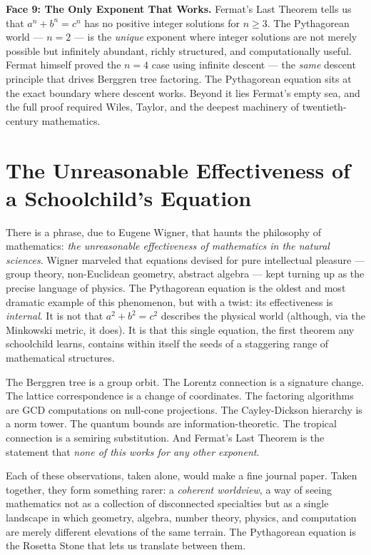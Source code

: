 \documentclass[11pt,twoside,openright]{book}
\theoremstyle{definition}
\theoremstyle{remark}
\begin{document}
\textbf{Face 9: The Only Exponent That Works.} Fermat's Last Theorem tells us that $a^n + b^n = c^n$ has no positive integer solutions for $n \geq 3$. The Pythagorean world --- $n = 2$ --- is the \textit{unique} exponent where integer solutions are not merely possible but infinitely abundant, richly structured, and computationally useful. Fermat himself proved the $n = 4$ case using infinite descent --- the \textit{same} descent principle that drives Berggren tree factoring. The Pythagorean equation sits at the exact boundary where descent works. Beyond it lies Fermat's empty sea, and the full proof required Wiles, Taylor, and the deepest machinery of twentieth-century mathematics.



\section{The Unreasonable Effectiveness of a Schoolchild's Equation}

There is a phrase, due to Eugene Wigner, that haunts the philosophy of mathematics: \textit{the unreasonable effectiveness of mathematics in the natural sciences}. Wigner marveled that equations devised for pure intellectual pleasure --- group theory, non-Euclidean geometry, abstract algebra --- kept turning up as the precise language of physics. The Pythagorean equation is the oldest and most dramatic example of this phenomenon, but with a twist: its effectiveness is \textit{internal}. It is not that $a^2 + b^2 = c^2$ describes the physical world (although, via the Minkowski metric, it does). It is that this single equation, the first theorem any schoolchild learns, contains within itself the seeds of a staggering range of mathematical structures.

The Berggren tree is a group orbit. The Lorentz connection is a signature change. The lattice correspondence is a change of coordinates. The factoring algorithms are GCD computations on null-cone projections. The Cayley-Dickson hierarchy is a norm tower. The quantum bounds are information-theoretic. The tropical connection is a semiring substitution. And Fermat's Last Theorem is the statement that \textit{none of this works for any other exponent}.

Each of these observations, taken alone, would make a fine journal paper. Taken together, they form something rarer: a \textit{coherent worldview}, a way of seeing mathematics not as a collection of disconnected specialties but as a single landscape in which geometry, algebra, number theory, physics, and computation are merely different elevations of the same terrain. The Pythagorean equation is the Rosetta Stone that lets us translate between them.
\end{document}
